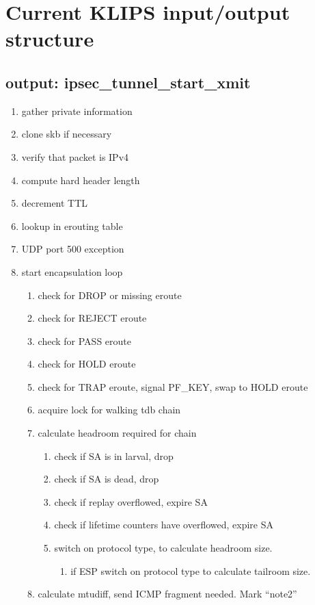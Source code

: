 \section{Current KLIPS input/output structure}

\subsection{output: ipsec\_tunnel\_start\_xmit}

\begin{enumerate}
	\item gather private information
	\item clone skb if necessary
	\item verify that packet is IPv4
	\item compute hard header length
	\item decrement TTL
	\item lookup in erouting table
	\item UDP port 500 exception
	\item start encapsulation loop
	\begin{enumerate}
		\item check for DROP or missing eroute
		\item check for REJECT eroute
		\item check for PASS eroute
		\item check for HOLD eroute
		\item check for TRAP eroute, signal PF\_KEY, swap to HOLD eroute
		\item acquire lock for walking tdb chain
		\item calculate headroom required for chain
		\begin{enumerate}
			\item check if SA is in larval, drop
			\item check if SA is dead, drop
			\item check if replay overflowed, expire SA
			\item check if lifetime counters have overflowed, expire SA
			\item switch on protocol type, to calculate headroom size.
			\begin{enumerate}
				\item if ESP switch on protocol type to calculate tailroom size.
			\end{enumerate}
		\end{enumerate}

		\item calculate mtudiff, send ICMP fragment needed. Mark ``note2''


\end{enumerate}
\end{enumerate}
